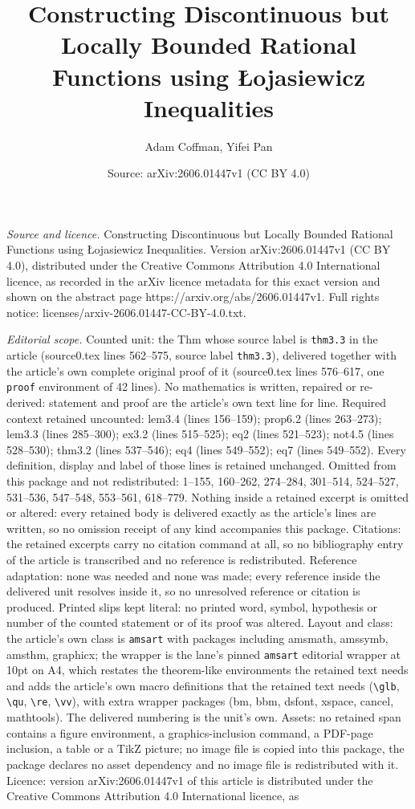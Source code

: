 \documentclass[10pt,a4paper]{amsart}
\title[Constructing Discontinuous but Locally Bounded Rational Func]{Constructing Discontinuous but Locally Bounded Rational Functions using \L ojasiewicz Inequalities}
\author{Adam Coffman, Yifei Pan}
\date{Source: arXiv:2606.01447v1 (CC BY 4.0)}
\begin{document}
\maketitle

\noindent\emph{Source and licence.} Constructing Discontinuous but Locally Bounded Rational Functions using \L ojasiewicz Inequalities. Version arXiv:2606.01447v1 (CC BY 4.0), distributed under the Creative Commons Attribution 4.0 International licence, as recorded in the arXiv licence metadata for this exact version and shown on the abstract page https://arxiv.org/abs/2606.01447v1. Full rights notice: licenses/arxiv-2606.01447-CC-BY-4.0.txt.\par\smallskip

\noindent\textit{Editorial scope.} Counted unit: the Thm whose source label is \texttt{thm3.3} in the article (source0.tex lines 562--575, source label \texttt{thm3.3}), delivered together with the article's own complete original proof of it (source0.tex lines 576--617, one \texttt{proof} environment of 42 lines). No mathematics is written, repaired or re-derived: statement and proof are the article's own text line for line. Required context retained uncounted: lem3.4 (lines 156--159); prop6.2 (lines 263--273); lem3.3 (lines 285--300); ex3.2 (lines 515--525); eq2 (lines 521--523); not4.5 (lines 528--530); thm3.2 (lines 537--546); eq4 (lines 549--552); eq7 (lines 549--552). Every definition, display and label of those lines is retained unchanged. Omitted from this package and not redistributed: 1--155, 160--262, 274--284, 301--514, 524--527, 531--536, 547--548, 553--561, 618--779. Nothing inside a retained excerpt is omitted or altered: every retained body is delivered exactly as the article's lines are written, so no omission receipt of any kind accompanies this package. Citations: the retained excerpts carry no citation command at all, so no bibliography entry of the article is transcribed and no reference is redistributed. Reference adaptation: none was needed and none was made; every reference inside the delivered unit resolves inside it, so no unresolved reference or citation is produced. Printed slips kept literal: no printed word, symbol, hypothesis or number of the counted statement or of its proof was altered. Layout and class: the article's own class is \texttt{amsart} with packages including amsmath, amssymb, amsthm, graphicx; the wrapper is the lane's pinned \texttt{amsart} editorial wrapper at 10pt on A4, which restates the theorem-like environments the retained text needs and adds the article's own macro definitions that the retained text needs (\texttt{\textbackslash glb}, \texttt{\textbackslash qu}, \texttt{\textbackslash re}, \texttt{\textbackslash vv}), with extra wrapper packages (bm, bbm, dsfont, xspace, cancel, mathtools). The delivered numbering is the unit's own. Assets: no retained span contains a figure environment, a graphics-inclusion command, a PDF-page inclusion, a table or a TikZ picture; no image file is copied into this package, the package declares no asset dependency and no image file is redistributed with it. Licence: version arXiv:2606.01447v1 of this article is distributed under the Creative Commons Attribution 4.0 International licence, as 
\end{document}
